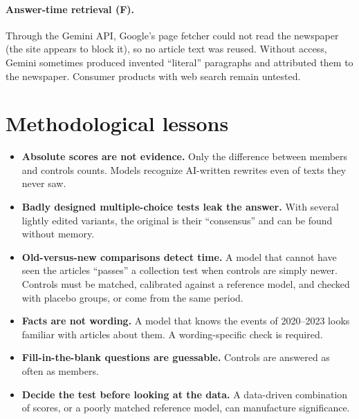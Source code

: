 \documentclass[10pt,a4paper]{article}
\begin{document}
\paragraph{Answer-time retrieval (F).} Through the Gemini API, Google's page fetcher could not read the newspaper
(the site appears to block it), so no article text was reused. Without access, Gemini sometimes produced invented
``literal'' paragraphs and attributed them to the newspaper. Consumer products with web search remain untested.

\section{Methodological lessons}\label{sec:lessons}
\begin{itemize}
\item \textbf{Absolute scores are not evidence.} Only the difference between members and controls counts. Models
recognize AI-written rewrites even of texts they never saw.
\item \textbf{Badly designed multiple-choice tests leak the answer.} With several lightly edited variants, the original
is their ``consensus'' and can be found without memory.
\item \textbf{Old-versus-new comparisons detect time.} A model that cannot have seen the articles ``passes'' a
collection test when controls are simply newer. Controls must be matched, calibrated against a reference model, and
checked with placebo groups, or come from the same period.
\item \textbf{Facts are not wording.} A model that knows the events of 2020--2023 looks familiar with articles about
them. A wording-specific check is required.
\item \textbf{Fill-in-the-blank questions are guessable.} Controls are answered as often as members.
\item \textbf{Decide the test before looking at the data.} A data-driven combination of scores, or a poorly matched
reference model, can manufacture significance.
\end{itemize}

\end{document}
